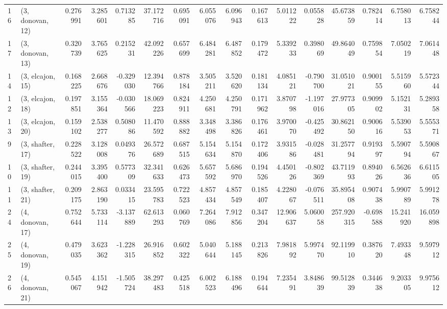 \begin{tabular}{llrrrrrrrrrrrrrr}
16 &  (3, donovan, 12) &   0.276991 &  3.285601 &  0.713285 &  37.172716 &  0.695091 &   6.055076 &  6.096943 &  0.167613 &   5.011222 &  0.055828 &   45.673859 &  0.782414 &   6.758013 &   6.758244 \\
17 &  (3, donovan, 13) &   0.320739 &  3.765625 &  0.215231 &  42.092226 &  0.657699 &   6.484281 &  6.487852 &  0.179472 &   5.339233 &  0.398069 &   49.864049 &  0.759854 &   7.050219 &   7.061448 \\
14 &  (3, elcajon, 15) &   0.168225 &  2.668676 & -0.329030 &  12.394766 &  0.878184 &   3.505211 &  3.520620 &  0.181134 &   4.085121 & -0.790700 &   31.051021 &  0.900155 &   5.515960 &   5.572344 \\
12 &  (3, elcajon, 18) &   0.197851 &  3.155364 & -0.030566 &  18.069223 &  0.824911 &   4.250681 &  4.250791 &  0.171962 &   3.870798 & -1.197016 &   27.977305 &  0.909902 &   5.152131 &   5.289358 \\
13 &  (3, elcajon, 20) &   0.159102 &  2.538277 &  0.508086 &  11.470592 &  0.888882 &   3.348498 &  3.386826 &  0.176461 &   3.970070 & -0.425492 &   30.862150 &  0.900616 &   5.539053 &   5.555371 \\
9  &  (3, shafter, 17) &   0.228522 &  3.128008 &  0.049376 &  26.572689 &  0.687515 &   5.154634 &  5.154870 &  0.172406 &   3.931586 & -0.028481 &   31.257794 &  0.919397 &   5.590794 &   5.590867 \\
10 &  (3, shafter, 19) &   0.244015 &  3.395400 &  0.577309 &  32.341633 &  0.626473 &   5.657592 &  5.686970 &  0.194526 &   4.450126 & -0.802369 &   43.711993 &  0.894026 &   6.562636 &   6.611505 \\
11 &  (3, shafter, 21) &   0.209175 &  2.863190 &  0.033415 &  23.595783 &  0.722523 &   4.857434 &  4.857549 &  0.185407 &   4.228067 & -0.076511 &   35.895408 &  0.907438 &   5.990789 &   5.991278 \\
24 &  (4, donovan, 17) &   0.752644 &  5.733114 & -3.137889 &  62.613293 &  0.060769 &   7.264086 &  7.912856 &  0.347204 &  12.906637 &  5.060058 &  257.920315 & -0.698588 &  15.241920 &  16.059898 \\
25 &  (4, donovan, 19) &   0.479035 &  3.623362 & -1.228315 &  26.916852 &  0.602322 &   5.040644 &  5.188145 &  0.213826 &   7.981892 &  5.997470 &   92.119910 &  0.387620 &   7.493348 &   9.597912 \\
26 &  (4, donovan, 21) &   0.545067 &  4.151942 & -1.505724 &  38.297483 &  0.425518 &   6.002523 &  6.188496 &  0.194644 &   7.235491 &  3.848639 &   99.512839 &  0.344638 &   9.203305 &   9.975612 \\

\end{tabular}
